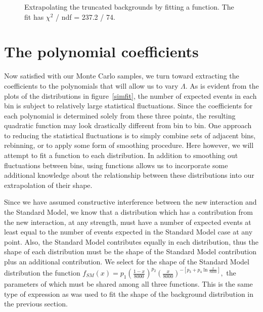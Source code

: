 \begin{figure}[htp]
\begin{minipage}[b]{.69\textwidth}
\begin{infilsf} \tiny

\end{infilsf}
\end{minipage}
\begin{minipage}[b]{.3\textwidth}
\caption{Extrapolating the truncated backgrounds by fitting a function. The fit has $\chi^2$ / ndf = 237.2 / 74.}\label{bckfit}
\end{minipage}
\end{figure}

\section{The polynomial coefficients}
Now satisfied with our Monte Carlo samples, we turn toward extracting the coefficients to the polynomials that will allow us to vary $\Lambda$. As is evident from the plots of the distributions in figure~\ref{simfit}, the number of expected events in each bin is subject to relatively large statistical fluctuations. Since the coefficients for each polynomial is determined solely from these three points, the resulting quadratic function may look drastically different from bin to bin. One approach to reducing the statistical fluctuations is to simply combine sets of adjacent bins, rebinning, or to apply some form of smoothing procedure. Here however, we will attempt to fit a function to each distribution. In addition to smoothing out fluctuations between bins, using functions allows us to incorporate some additional knowledge about the relationship between these distributions into our extrapolation of their shape.

Since we have assumed constructive interference between the new interaction and the Standard Model, we know that a distribution which has a contribution from the new interaction, at any strength, must have a number of expected events at least equal to the number of events expected in the Standard Model case at any point. Also, the Standard Model contributes equally in each distribution, thus the shape of each distribution must be the shape of the Standard Model contribution plus an additional contribution. We select for the shape of the Standard Model distribution the function
\(f_\textit{SM}(x)=p_1\left(\frac{1-x}{8000}\right)^{p_2}\left(\frac{x}{8000}\right)^{-\left[p_3+p_4\ln\frac{x}{8000}\right]},\)
the parameters of which must be shared among all three functions. This is the same type of expression as was used to fit the shape of the background distribution in the previous section.

